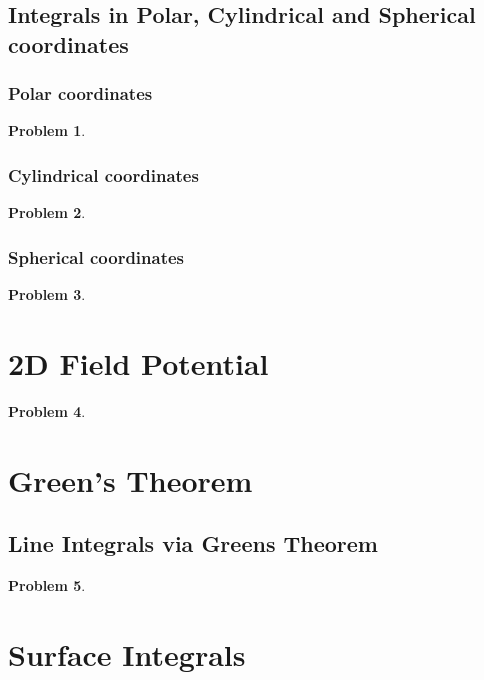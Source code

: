 \documentclass{article}
\newtheorem{problem}{Problem}
\begin{document}
\subsection{Integrals in Polar, Cylindrical and Spherical coordinates}
\subsubsection{Polar coordinates}
\begin{problem}

\end{problem}
\subsubsection{Cylindrical coordinates}
\begin{problem}

\end{problem}
\subsubsection{Spherical coordinates}
\begin{problem}

\end{problem}
\section{2D Field Potential}
\begin{problem}

\end{problem}
\section{Green's Theorem}
\subsection{Line Integrals via Greens Theorem}
\begin{problem}

\end{problem}
\section{Surface Integrals}
\end{document}
